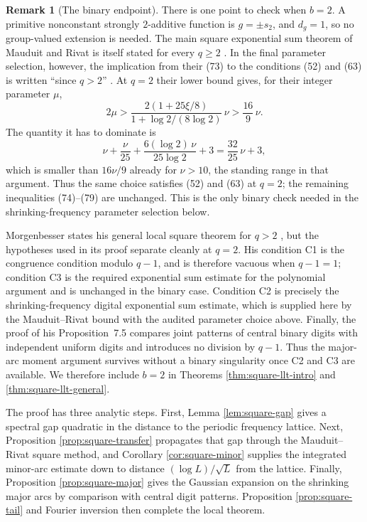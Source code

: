 \documentclass[11pt,reqno]{amsart}
\theoremstyle{plain}
\theoremstyle{definition}
\newtheorem{remark}[theorem]{Remark}
\newcommand{\1}{\mathbf 1}
\begin{document}
\begin{remark}[The binary endpoint]\label{rem:binary-square}
There is one point to check when $b=2$.  A primitive nonconstant strongly $2$-additive function is $g=\pm s_2$, and $d_g=1$, so no group-valued extension is needed.  The main square exponential sum theorem of Mauduit and Rivat is itself stated for every $q\ge2$ \cite[Theorem~1]{mauduitrivat-squares}.  In the final parameter selection, however, the implication from their (73) to the conditions (52) and (63) is written ``since $q>2$'' \cite[(73)--(79)]{mauduitrivat-squares}.  At $q=2$ their lower bound gives, for their integer parameter $\mu$,
\[
 2\mu>
 \frac{2(1+25\xi/8)}{1+\log2/(8\log2)}\,\nu
 >\frac{16}{9}\,\nu.
\]
The quantity it has to dominate is
\[
 \nu+\frac{\nu}{25}+\frac{6(\log2)\,\nu}{25\log2}+3
 =\frac{32}{25}\,\nu+3,
\]
which is smaller than $16\nu/9$ already for $\nu>10$, the standing range in that argument.  Thus the same choice satisfies (52) and (63) at $q=2$; the remaining inequalities (74)--(79) are unchanged.  This is the only binary check needed in the shrinking-frequency parameter selection below.

Morgenbesser states his general local square theorem for $q>2$ \cite[Theorem~7.1]{morgenbesser}, but the hypotheses used in its proof separate cleanly at $q=2$.  His condition C1 is the congruence condition modulo $q-1$, and is therefore vacuous when $q-1=1$; condition C3 is the required exponential sum estimate for the polynomial argument and is unchanged in the binary case.  Condition C2 is precisely the shrinking-frequency digital exponential sum estimate, which is supplied here by the Mauduit--Rivat bound with the audited parameter choice above.  Finally, the proof of his Proposition~7.5 compares joint patterns of central binary digits with independent uniform digits and introduces no division by $q-1$.  Thus the major-arc moment argument survives without a binary singularity once C2 and C3 are available.  We therefore include $b=2$ in Theorems \ref{thm:square-llt-intro} and \ref{thm:square-llt-general}.
\end{remark}

The proof has three analytic steps.  First, Lemma \ref{lem:square-gap} gives a spectral gap quadratic in the distance to the periodic frequency lattice.  Next, Proposition \ref{prop:square-transfer} propagates that gap through the Mauduit--Rivat square method, and Corollary \ref{cor:square-minor} supplies the integrated minor-arc estimate down to distance $(\log L)/\sqrt L$ from the lattice.  Finally, Proposition \ref{prop:square-major} gives the Gaussian expansion on the shrinking major arcs by comparison with central digit patterns.  Proposition \ref{prop:square-tail} and Fourier inversion then complete the local theorem.
\end{document}
